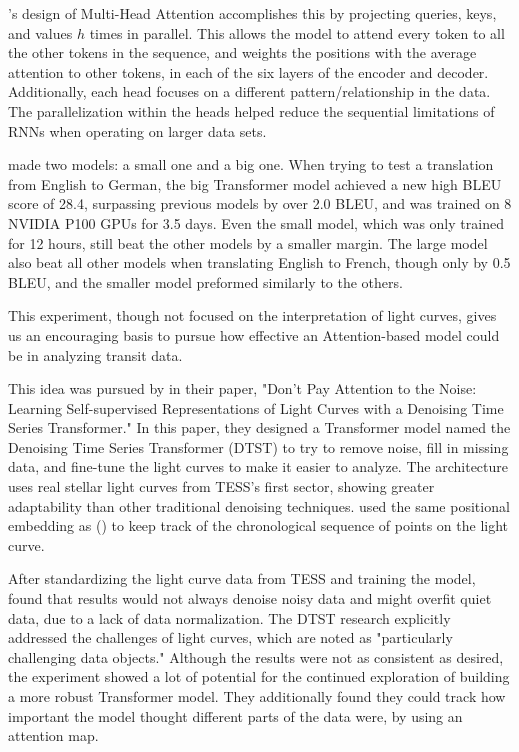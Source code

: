 \documentclass[letterpaper]{article} %
\begin{document}
\citeauthor{vaswani2017attentionneed}'s design of Multi-Head Attention accomplishes this by projecting queries, keys, and values $h$ times in parallel. This allows the model to attend every token to all the other tokens in the sequence, and weights the positions with the average attention to other tokens, in each of the six layers of the encoder and decoder. Additionally, each head focuses on a different pattern/relationship in the data. The parallelization within the heads helped reduce the sequential limitations of RNNs when operating on larger data sets. 

\citeauthor{vaswani2017attentionneed} made two models: a small one and a big one. When trying to test a translation from English to German, the big Transformer model achieved a new high BLEU score of 28.4, surpassing previous models by over 2.0 BLEU, and was trained on 8 NVIDIA P100 GPUs for 3.5 days. Even the small model, which was only trained for 12 hours, still beat the other models by a smaller margin. The large model also beat all other models when translating English to French, though only by 0.5 BLEU, and the smaller model preformed similarly to the others. 

This experiment, though not focused on the interpretation of light curves, gives us an encouraging basis to pursue how effective an Attention-based model could be in analyzing transit data.

This idea was pursued by \citeauthor{morvan2022dontpayattentionnoise} in their \citeyear{morvan2022dontpayattentionnoise} paper, "Don’t Pay Attention to the Noise: Learning Self-supervised Representations of Light Curves with a Denoising Time Series Transformer." In this paper, they designed a Transformer model named the Denoising Time Series Transformer (DTST) to try to remove noise, fill in missing data, and fine-tune the light curves to make it easier to analyze. The architecture uses real stellar light curves from TESS's first sector, showing greater adaptability than other traditional denoising techniques. \citeauthor{morvan2022dontpayattentionnoise} used the same positional embedding as \citeauthor{vaswani2017attentionneed} (\citeyear{vaswani2017attentionneed}) to keep track of the chronological sequence of points on the light curve. 

After standardizing the light curve data from TESS and training the model, \citeauthor{morvan2022dontpayattentionnoise} found that results would not always denoise noisy data and might overfit quiet data, due to a lack of data normalization. The DTST research explicitly addressed the challenges of light curves, which are noted as "particularly challenging data objects." Although the results were not as consistent as desired, the experiment showed a lot of potential for the continued exploration of building a more robust Transformer model. They additionally found they could track how important the model thought different parts of the data were, by using an attention map.
\end{document}
